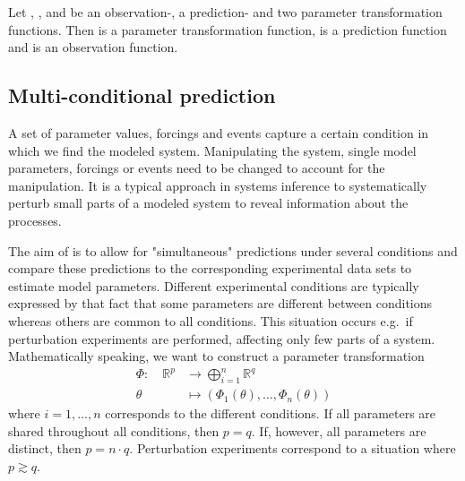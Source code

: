 \documentclass[article]{jss}
\begin{document}
Let , ,  and  be an observation-, a prediction- and two parameter transformation functions. Then  is a parameter transformation function,  is a prediction function and  is an observation function.

\subsection{Multi-conditional prediction}

A set of parameter values, forcings and events capture a certain condition in which we find the modeled system. Manipulating the system, single model parameters, forcings or events need to be changed to account for the manipulation. It is a typical approach in systems inference to systematically perturb small parts of a modeled system to reveal information about the processes.

The aim of  is to allow for "simultaneous" predictions under several conditions and compare these predictions to the corresponding experimental data sets to estimate model parameters.
Different experimental conditions are typically expressed by that fact that some parameters are different between conditions whereas others are common to all conditions. This situation occurs e.g.~if perturbation experiments are performed, affecting only few parts of a system.
Mathematically speaking, we want to construct a parameter transformation
\begin{equation}
	\begin{aligned}
		\Phi:\quad \mathbb R^p & \longrightarrow  \bigoplus_{i = 1}^n \mathbb R^q \\
		\theta & \longmapsto  \left(\Phi_1(\theta), \dots, \Phi_n(\theta)\right)
	\end{aligned}
	\label{eq:partrafo}
\end{equation}
where $i = 1, \dots, n$ corresponds to the different conditions. If all parameters are shared throughout all conditions, then $p = q$. If, however, all parameters are distinct, then $p = n\cdot q$. Perturbation experiments correspond to a situation where $p\gtrsim q$.
\end{document}
